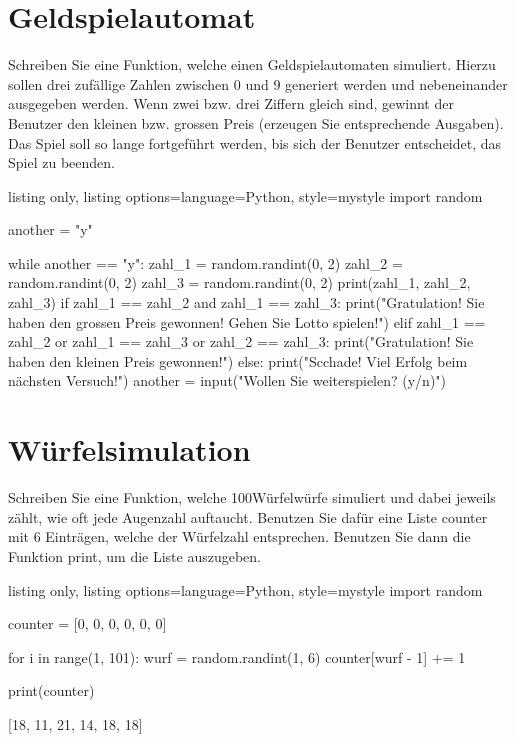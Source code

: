 \documentclass[11pt, oneside]{book}
\begin{document}
\section{Geldspielautomat}
Schreiben Sie eine Funktion, welche einen Geldspielautomaten simuliert. Hierzu sollen drei zufällige Zahlen zwischen 0 und 9 generiert werden und nebeneinander ausgegeben werden. Wenn zwei bzw. drei Ziffern gleich sind, gewinnt der Benutzer den kleinen bzw. grossen Preis (erzeugen Sie entsprechende Ausgaben). Das Spiel soll so lange fortgeführt werden, bis sich der Benutzer entscheidet, das Spiel zu beenden.
\begin{tcblisting}{listing only, listing options={language=Python, style=mystyle}}
import random

another = "y"

while another == "y":
    zahl_1 = random.randint(0, 2)
    zahl_2 = random.randint(0, 2)
    zahl_3 = random.randint(0, 2)
    print(zahl_1, zahl_2, zahl_3)
    if zahl_1 == zahl_2 and zahl_1 == zahl_3:
        print("Gratulation! Sie haben den grossen Preis gewonnen! Gehen Sie Lotto spielen!")
    elif zahl_1 == zahl_2 or zahl_1 == zahl_3 or zahl_2 == zahl_3:
        print("Gratulation! Sie haben den kleinen Preis gewonnen!")
    else:
        print("Scchade! Viel Erfolg beim nächsten Versuch!")
    another = input("Wollen Sie weiterspielen? (y/n)")
\end{tcblisting}

\section{Würfelsimulation}
Schreiben Sie eine Funktion, welche 100Würfelwürfe simuliert und dabei jeweils zählt, wie oft jede Augenzahl auftaucht. Benutzen Sie dafür eine Liste counter mit 6 Einträgen, welche der Würfelzahl entsprechen. Benutzen Sie dann die Funktion print, um die Liste auszugeben.
\begin{tcblisting}{listing only, listing options={language=Python, style=mystyle}}
import random

counter = [0, 0, 0, 0, 0, 0]

for i in range(1, 101):
    wurf = random.randint(1, 6)
    counter[wurf - 1] += 1

print(counter)

[18, 11, 21, 14, 18, 18]
\end{tcblisting}

\newpage
\end{document}
